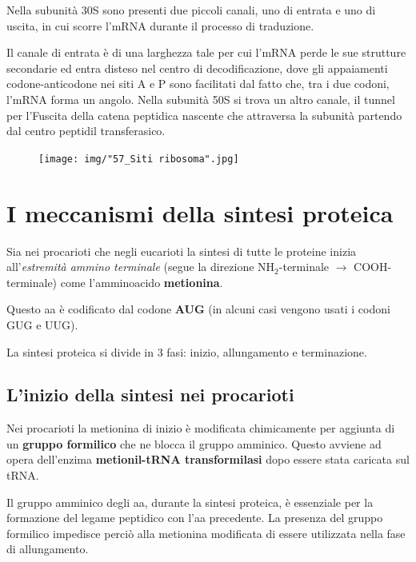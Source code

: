\documentclass[11pt]{book}
\begin{document}
Nella subunità 30S sono presenti due piccoli canali, uno di entrata e
uno di uscita, in cui scorre l'mRNA durante il processo di traduzione.

Il canale di entrata è di una larghezza tale per cui l'mRNA perde le sue
strutture secondarie ed entra disteso nel centro di decodificazione,
dove gli appaiamenti codone-anticodone nei siti A e P sono facilitati
dal fatto che, tra i due codoni, l'mRNA forma un angolo. Nella subunità
50S si trova un altro canale, il tunnel per l'Fuscita della catena
peptidica nascente che attraversa la subunità partendo dal centro
peptidil transferasico.

\begin{figure}[htp]
\centering
\texttt{[image: img/"57\_Siti ribosoma".jpg]}
\caption{}
\label{siti-ribosoma}
\end{figure}

\section{I meccanismi della sintesi
proteica}\label{i-meccanismi-della-sintesi-proteica}

Sia nei procarioti che negli eucarioti la sintesi di tutte le proteine
inizia all'\emph{estremità ammino terminale} (segue la direzione
NH\(_2\)-terminale \(\rightarrow\) COOH-terminale) come l'amminoacido
\textbf{metionina}.

Questo aa è codificato dal codone \textbf{AUG} (in alcuni casi vengono
usati i codoni GUG e UUG).

La sintesi proteica si divide in 3 fasi: inizio, allungamento e
terminazione.

\subsection{L'inizio della sintesi nei
procarioti}\label{linizio-della-sintesi-nei-procarioti}

Nei procarioti la metionina di inizio è modificata chimicamente per
aggiunta di un \textbf{gruppo formilico} che ne blocca il gruppo
amminico. Questo avviene ad opera dell'enzima \textbf{metionil-tRNA
transformilasi} dopo essere stata caricata sul tRNA.

Il gruppo amminico degli aa, durante la sintesi proteica, è essenziale
per la formazione del legame peptidico con l'aa precedente. La presenza
del gruppo formilico impedisce perciò alla metionina modificata di
essere utilizzata nella fase di allungamento.
\end{document}
